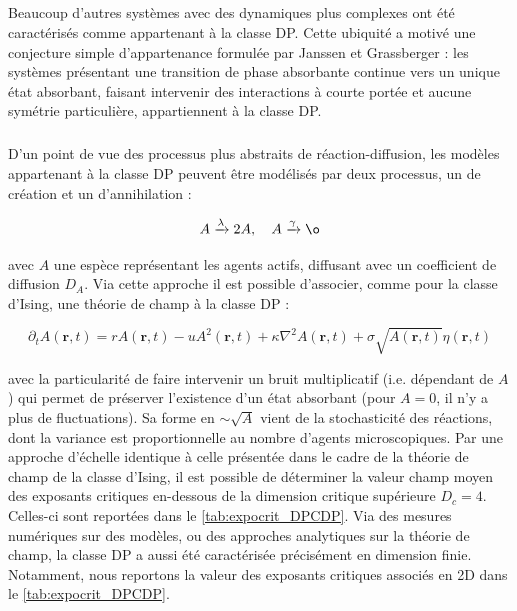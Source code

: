 \subparagraph{}Beaucoup d'autres systèmes avec des dynamiques plus complexes ont été caractérisés comme appartenant à la classe DP. Cette ubiquité a motivé une conjecture simple d'appartenance formulée par Janssen et Grassberger \cite{janssen_nonequilibrium_1981, grassberger_phase_1982} : les systèmes présentant une transition de phase absorbante continue vers un unique état absorbant, faisant intervenir des interactions à courte portée et aucune symétrie particulière, appartiennent à la classe DP.

\subparagraph{}D'un point de vue des processus plus abstraits de réaction-diffusion, les modèles appartenant à la classe DP peuvent être modélisés par deux processus, un de création et un d’annihilation :

\begin{equation}
A \xrightarrow[]{\lambda} 2A, \quad A \xrightarrow[]{\gamma} \o
\label{eq:ReacDiffDP}
\end{equation}

\noindent avec $A$ une espèce représentant les agents actifs, diffusant avec un coefficient de diffusion $D_A$. Via cette approche il est possible d'associer, comme pour la classe d'Ising, une théorie de champ à la classe DP :

\begin{equation}
	\partial_t A(\mathbf{r}, t) = rA(\mathbf{r}, t) - uA^2(\mathbf{r}, t) + \kappa\nabla^2 A (\mathbf{r}, t) + \sigma \sqrt{A(\mathbf{r}, t)} \eta(\mathbf{r}, t)
	\label{eq:eqDP}
\end{equation}

\noindent avec la particularité de faire intervenir un bruit multiplicatif (i.e. dépendant de $A$) qui permet de préserver l'existence d'un état absorbant (pour $A=0$, il n'y a plus de fluctuations). Sa forme en $\sim \sqrt{A}$ vient de la stochasticité des réactions, dont la variance est proportionnelle au nombre d'agents microscopiques.  Par une approche d'échelle identique à celle présentée dans le cadre de la théorie de champ de la classe d'Ising, il est possible de déterminer la valeur champ moyen des exposants critiques en-dessous de la dimension critique supérieure $D_c = 4$. Celles-ci sont reportées dans le \autoref{tab:expocrit_DPCDP}. Via des mesures numériques sur des modèles, ou des approches analytiques sur la théorie de champ, la classe DP a aussi été caractérisée précisément en dimension finie. Notamment, nous reportons la valeur des exposants critiques associés en 2D dans le \autoref{tab:expocrit_DPCDP}.

